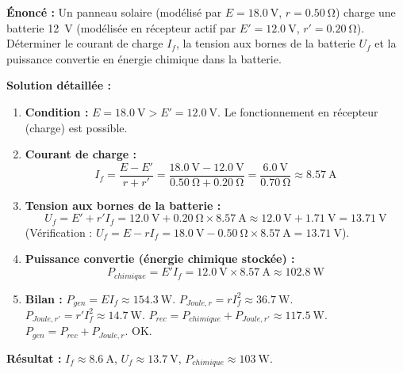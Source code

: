 \documentclass[11pt]{article}
\begin{document}
\begin{exoresolu}
\textbf{Énoncé :} Un panneau solaire (modélisé par $E = \SI{18,0}{\volt}$, $r = \SI{0,50}{\ohm}$) charge une batterie \SI{12}{\volt} (modélisée en récepteur actif par $E' = \SI{12,0}{\volt}$, $r' = \SI{0,20}{\ohm}$). Déterminer le courant de charge $I_f$, la tension aux bornes de la batterie $U_f$ et la puissance convertie en énergie chimique dans la batterie.

\textbf{Solution détaillée :}
\begin{enumerate}
\item \textbf{Condition :} $E = \SI{18,0}{\volt} > E' = \SI{12,0}{\volt}$. Le fonctionnement en récepteur (charge) est possible.
\item \textbf{Courant de charge :}
\[
I_f = \frac{E - E'}{r + r'} = \frac{\SI{18,0}{\volt} - \SI{12,0}{\volt}}{\SI{0,50}{\ohm} + \SI{0,20}{\ohm}} = \frac{\SI{6,0}{\volt}}{\SI{0,70}{\ohm}} \approx \SI{8,57}{\ampere}
\]
\item \textbf{Tension aux bornes de la batterie :}
\[
U_f = E' + r' I_f = \SI{12,0}{\volt} + \SI{0,20}{\ohm} \times \SI{8,57}{\ampere} \approx \SI{12,0}{\volt} + \SI{1,71}{\volt} = \SI{13,71}{\volt}
\]
(Vérification : $U_f = E - r I_f = \SI{18,0}{\volt} - \SI{0,50}{\ohm} \times \SI{8,57}{\ampere} = \SI{13,71}{\volt}$).
\item \textbf{Puissance convertie (énergie chimique stockée) :}
\[
P_{chimique} = E' I_f = \SI{12,0}{\volt} \times \SI{8,57}{\ampere} \approx \SI{102,8}{\watt}
\]
\item \textbf{Bilan :} $P_{gen} = E I_f \approx \SI{154,3}{\watt}$. $P_{Joule, r} = r I_f^2 \approx \SI{36,7}{\watt}$. $P_{Joule, r'} = r' I_f^2 \approx \SI{14,7}{\watt}$. $P_{rec} = P_{chimique} + P_{Joule, r'} \approx \SI{117,5}{\watt}$. $P_{gen} = P_{rec} + P_{Joule, r}$. OK.
\end{enumerate}
\textbf{Résultat :} $\boxed{I_f \approx \SI{8,6}{\ampere}}$, $\boxed{U_f \approx \SI{13,7}{\volt}}$, $\boxed{P_{chimique} \approx \SI{103}{\watt}}$.
\end{exoresolu}
\end{document}
